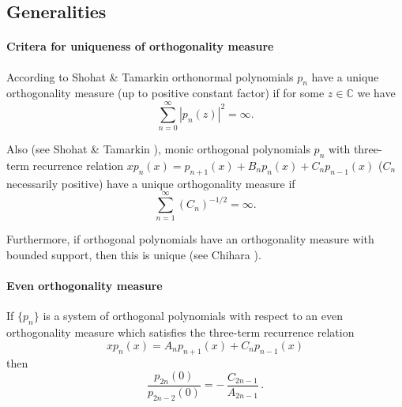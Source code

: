 \documentclass[twoside,11pt]{article}
\newcommand\CC{\mathbb{C}}
\newcommand\iy\infty
\begin{document}
\subsection*{Generalities}
\paragraph{Critera for uniqueness of orthogonality measure}
According to Shohat \& Tamarkin \cite[p.50]{K6}
orthonormal polynomials $p_n$ have a unique orthogonality measure (up to positive
constant factor) if
for some $z\in\CC$ we have
\begin{equation}
\sum_{n=0}^\iy |p_n(z)|^2 = \iy.
\label{90}
\end{equation}

Also (see Shohat \& Tamarkin \cite[p.59]{K6}),
monic orthogonal polynomials $p_n$ with three-term recurrence relation
$x p_n(x) = p_{n+1}(x)+B_n p_n(x)+C_n p_{n-1}(x)$
($C_n$ necessarily positive)
have a unique orthogonality measure if
\begin{equation}
\sum_{n=1}^\iy (C_n)^{-1/2}=\iy.
\label{93}
\end{equation}

Furthermore, if orthogonal polynomials have an orthogonality measure with
bounded support, then this is unique (see Chihara \cite{146}).
%
\paragraph{Even orthogonality measure}
If $\{p_n\}$ is a system of orthogonal polynomials with respect to an even
orthogonality measure which satisfies the three-term recurrence relation
\begin{equation*}
x p_n(x)=A_n p_{n+1}(x)+C_n p_{n-1}(x)
\end{equation*}
then
\begin{equation}
\frac{p_{2n}(0)}{p_{2n-2}(0)}=-\,\frac{C_{2n-1}}{A_{2n-1}}\,.
\label{1}
\end{equation}
%
\end{document}
